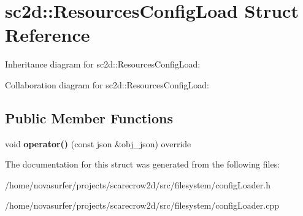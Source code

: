 \hypertarget{structsc2d_1_1ResourcesConfigLoad}{}\section{sc2d\+:\+:Resources\+Config\+Load Struct Reference}
\label{structsc2d_1_1ResourcesConfigLoad}


Inheritance diagram for sc2d\+:\+:Resources\+Config\+Load\+:


Collaboration diagram for sc2d\+:\+:Resources\+Config\+Load\+:
\subsection*{Public Member Functions}
\begin{DoxyCompactItemize}
\item 
\mbox{\label{structsc2d_1_1ResourcesConfigLoad_a7e6fc312fa6e36b5f9b8bd234845faee}} 
void {\bfseries operator()} (const json \&obj\+\_\+json) override
\end{DoxyCompactItemize}


The documentation for this struct was generated from the following files\+:\begin{DoxyCompactItemize}
\item 
/home/novasurfer/projects/scarecrow2d/src/filesystem/config\+Loader.\+h\item 
/home/novasurfer/projects/scarecrow2d/src/filesystem/config\+Loader.\+cpp\end{DoxyCompactItemize}
